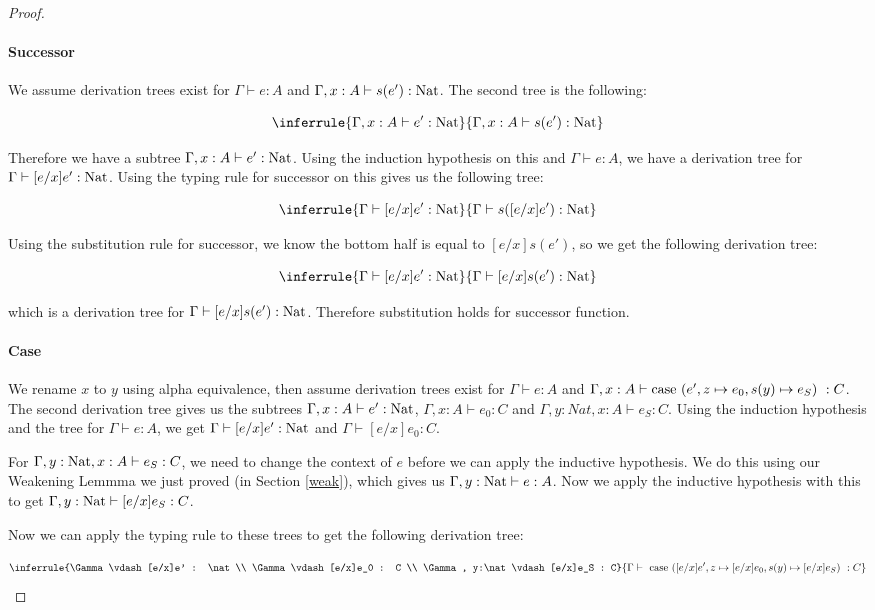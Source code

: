 \begin{proof}
\paragraph{Successor} We assume derivation trees exist for $\Gamma \vdash e : A$ and $\Gamma, x:A \vdash s(e') : \operatorname{Nat}$. The second tree is the following:

$$\inferrule{\Gamma, x:A \vdash e' : \nat}{\Gamma, x:A \vdash s(e') : \nat}$$

Therefore we have a subtree $\Gamma, x:A \vdash e' : \operatorname{Nat}$. Using the induction hypothesis on this and $\Gamma \vdash e : A$, we have a derivation tree for $\Gamma \vdash [e/x]e' : \operatorname{Nat}$. Using the typing rule for successor on this gives us the following tree:

$$\inferrule{\Gamma \vdash [e/x]e' : \nat}{\Gamma \vdash s([e/x]e') : \nat}$$

Using the substitution rule for successor, we know the bottom half is equal to $[e/x]s(e')$, so we get the following derivation tree:

 $$\inferrule{\Gamma \vdash [e/x]e' : \nat}{\Gamma \vdash [e/x]s(e') : \nat}$$
 
which is a derivation tree for $\Gamma \vdash [e/x]s(e') : \operatorname{Nat}$. Therefore substitution holds for successor function.

\paragraph{Case} We rename $x$ to $y$ using alpha equivalence, then assume derivation trees exist for $\Gamma \vdash e : A$ and $\Gamma, x: A \vdash \operatorname{case} \ (e', z \mapsto e_0 , s(y) \mapsto e_S) \  : C$. The second derivation tree gives us the subtrees $\Gamma, x:A \vdash e' : \operatorname{Nat}$, $\Gamma, x : A \vdash e_0 : C$ and $\Gamma, y:Nat, x : A \vdash e_S : C$. Using the induction hypothesis and the tree for $\Gamma \vdash e : A$, we get  $\Gamma \vdash [e/x]e' : \operatorname{Nat}$ and $\Gamma \vdash [e/x]e_0 : C$.

For $\Gamma, y:\operatorname{Nat}, x : A \vdash e_S : C$, we need  to change the context of $e$ before we can apply the inductive hypothesis. We do this using our  Weakening Lemmma we just proved (in Section \ref{weak}), which gives us $\Gamma, y:\operatorname{Nat} \vdash e : A$. Now we apply the inductive hypothesis with this to get $\Gamma, y:\operatorname{Nat} \vdash [e/x]e_S : C$.
 
 
Now we can apply the typing rule to these trees to get the following derivation tree:

$$\inferrule{\Gamma \vdash [e/x]e' : \nat \\  \Gamma \vdash [e/x]e_0 : C \\  \Gamma , y:\nat \vdash [e/x]e_S : C}  {\Gamma \vdash \ \case \ ([e/x]e', z \mapsto [e/x]e_0 , s(y) \mapsto [e/x]e_S) \  : C}  
$$


\end{proof}
